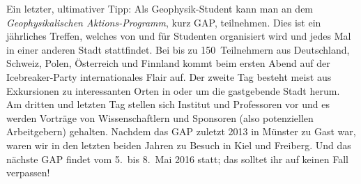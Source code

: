 \begin{multicols}{2}
Ein letzter, ultimativer Tipp: Als Geophysik-Student kann man an dem \emph{Geophysikalischen Aktions-Programm}, kurz GAP, teilnehmen. Dies ist ein jährliches Treffen, welches von und für Studenten organisiert wird und jedes Mal in einer anderen Stadt stattfindet. Bei bis zu 150~Teilnehmern aus Deutschland, Schweiz, Polen, Österreich und Finnland kommt beim ersten Abend auf der Icebreaker-Party internationales Flair auf. Der zweite Tag besteht meist aus Exkursionen zu interessanten Orten in oder um die gastgebende Stadt herum. Am dritten und letzten Tag stellen sich Institut und Professoren vor und es werden Vorträge von Wissenschaftlern und Sponsoren (also potenziellen Arbeitgebern) gehalten. Nachdem das GAP zuletzt 2013 in Münster zu Gast war, waren wir in den letzten beiden Jahren zu Besuch in Kiel und Freiberg. Und das nächste GAP findet vom 5.~bis 8.~Mai 2016 statt; das solltet ihr auf keinen Fall verpassen!

\end{multicols}

